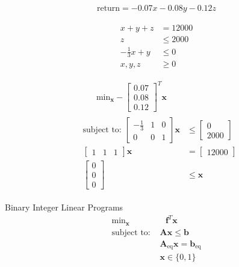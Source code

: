 \documentclass{article}
\begin{document}
\begin{align*}
    \text{return} = -0.07x - 0.08y - 0.12z
\end{align*}

\begin{align*}
    x + y + z &= 12000\\
    z &\le 2000 \\
    -\frac{1}{3}x + y &\le 0\\
    x,y,z &\ge 0
\end{align*}

\begin{align*}
    &\qquad \text{min}_{\mathbf{x}} -\begin{bmatrix} 0.07 \\ 0.08 \\ 0.12 \end{bmatrix}^T \mathbf{x} \\
    &\begin{aligned}
    \mbox{subject to: } \begin{bmatrix} -\frac{1}{3} & 1 & 0 \\ 0 & 0 & 1 \end{bmatrix} \mathbf{x} &\le \begin{bmatrix} 0 \\ 2000 \end{bmatrix} \\
                        \begin{bmatrix} 1 & 1 & 1 \end{bmatrix} \mathbf{x} &= \begin{bmatrix} 12000 \end{bmatrix} \\
                        \begin{bmatrix} 0 \\ 0 \\ 0 \end{bmatrix} &\le \mathbf{x}
    \end{aligned}
\end{align*}

Binary Integer Linear Programs
\begin{align*}
    \text{min}_{\mathbf{x}}& \text{ } \mathbf{f}^T \mathbf{x} \\
    \mbox{subject to: }& \mathbf{A}\mathbf{x} \le \mathbf{b}\\
                       & \mathbf{A}_{\text{eq}}\mathbf{x} = \mathbf{b}_{\text{eq}}\\
                       & \mathbf{x} \in \{0,1\}\\
\end{align*}
\end{document}
